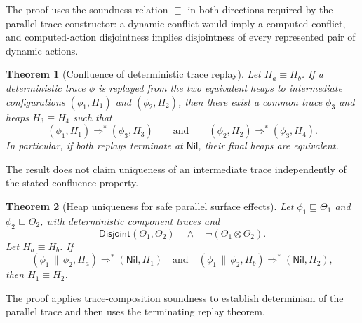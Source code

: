 \documentclass[10pt,a4paper]{article}
\newcommand{\conflict}{\mathrel{\otimes}}             %
\newcommand{\approxx}{\mathrel{\sqsubseteq}}          %
\newcommand{\Nil}{\mathsf{Nil}}
\newcommand{\Disjoint}{\mathsf{Disjoint}}
\newtheorem{theorem}{Theorem}
\begin{document}
The proof uses the soundness relation $\approxx$ in both directions required by
the parallel-trace constructor: a dynamic conflict would imply a computed
conflict, and computed-action disjointness implies disjointness of every
represented pair of dynamic actions.

\begin{theorem}[Confluence of deterministic trace replay]
Let $H_a \equiv H_b$. If a deterministic trace $\phi$ is replayed from the two
equivalent heaps to intermediate configurations
$(\phi_1,H_1)$ and $(\phi_2,H_2)$, then there exist a common trace $\phi_3$ and
heaps $H_3 \equiv H_4$ such that
\[
(\phi_1,H_1)\Rightarrow^{*}(\phi_3,H_3)
\qquad\text{and}\qquad
(\phi_2,H_2)\Rightarrow^{*}(\phi_3,H_4).
\]
In particular, if both replays terminate at $\Nil$, their final heaps are
equivalent.
\end{theorem}

The result does not claim uniqueness of an intermediate trace independently of
the stated confluence property.

\begin{theorem}[Heap uniqueness for safe parallel surface effects]
Let $\phi_1 \approxx \Theta_1$ and $\phi_2 \approxx \Theta_2$, with deterministic
component traces and
\[
\Disjoint(\Theta_1,\Theta_2)
\quad\land\quad
\neg(\Theta_1 \conflict \Theta_2).
\]
Let $H_a \equiv H_b$. If
\[
(\phi_1\,\|\,\phi_2,H_a)\Rightarrow^{*}(\Nil,H_1)
\quad\text{and}\quad
(\phi_1\,\|\,\phi_2,H_b)\Rightarrow^{*}(\Nil,H_2),
\]
then $H_1 \equiv H_2$.
\end{theorem}

The proof applies trace-composition soundness to establish determinism of the parallel
trace and then uses the terminating replay theorem.
\end{document}
